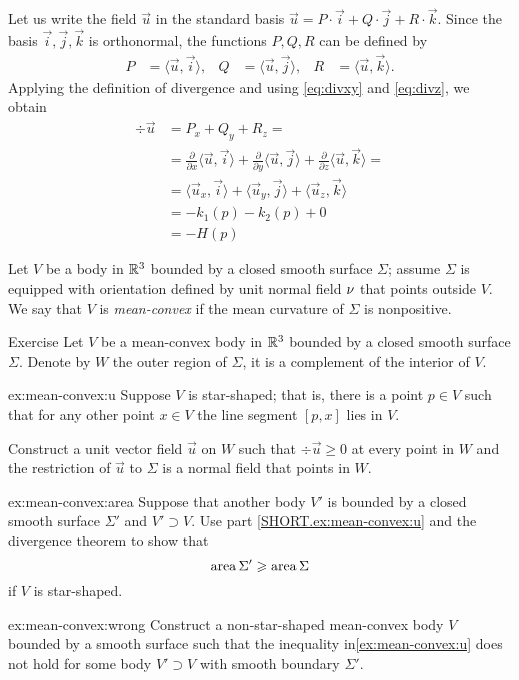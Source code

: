 Let us write the field $\vec u$ in the standard basis 
$\vec u=P\cdot \vec i+Q\cdot\vec j+R\cdot\vec k$.
Since the basis $\vec i,\vec j,\vec k$ is orthonormal, the functions $P,Q,R$ can be defined by
\begin{align*}
P&=\langle\vec u,\vec i\rangle,
&
Q&=\langle\vec u,\vec j\rangle,
&
R&=\langle\vec u,\vec k\rangle.
\end{align*}
Applying the definition of divergence and using \ref{eq:divxy} and \ref{eq:divz}, we obtain
\begin{align*}
\div\vec u&=P_x+Q_y+R_z=
\\
&=\tfrac{\partial}{\partial x}\langle\vec u,\vec i \rangle
+
\tfrac{\partial}{\partial y}\langle\vec u,\vec j \rangle
+
\tfrac{\partial}{\partial z}\langle\vec u,\vec k\rangle
=
\\
&=\langle\vec u_x,\vec i \rangle
+
\langle \vec u_y,\vec j \rangle
+
\langle\vec u_z,\vec k \rangle
\\
&=-k_1(p)-k_2(p)+0
\\
&=-H(p)
\end{align*}
\qedsf

Let $V$ be a body in $\mathbb{R}^3$ bounded by a closed smooth surface $\Sigma$;
assume $\Sigma$ is equipped with orientation defined by unit normal field $\nu$ that points outside $V$.
We say that $V$ is \emph{mean-convex} if the mean curvature of $\Sigma$ is nonpositive.

\begin{thm}{Exercise}\label{ex:mean-convex}
Let $V$ be a mean-convex body in $\mathbb{R}^3$ bounded by a closed smooth surface $\Sigma$.
Denote by $W$ the outer region of $\Sigma$, it is a complement of the interior of $V$.

\begin{subthm}{ex:mean-convex:u}
Suppose $V$ is star-shaped; that is, there is a point $p\in V$ such that for any other point $x\in V$ the line segment $[p,x]$ lies in $V$.

Construct a unit vector field $\vec u$ on $W$ such that $\div  \vec u\ge 0$ at every point in $W$ and the restriction of $\vec u$ to $\Sigma$ is a normal field that points in $W$.
\end{subthm}
 
\begin{subthm}{ex:mean-convex:area} Suppose that another body $V'$ is bounded by a closed smooth surface $\Sigma'$ and $V'\supset V$.
Use part \ref{SHORT.ex:mean-convex:u} and the divergence theorem to show that 
\[\mathop{\rm area}\nolimits\Sigma'\geqslant \mathop{\rm area}\nolimits\Sigma\]
if $V$ is star-shaped.
\end{subthm}

\begin{subthm}{ex:mean-convex:wrong} Construct a non-star-shaped mean-convex body $V$ bounded by a smooth surface such that the inequality in\ref{ex:mean-convex:u} does not hold for some body $V'\supset V$ with smooth boundary $\Sigma'$.
\end{subthm}
\end{thm}

